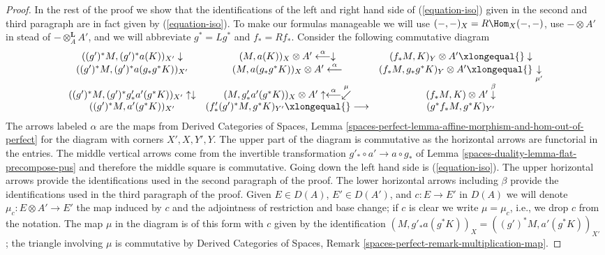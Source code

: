 \begin{proof}
\medskip\noindent
In the rest of the proof we show that the identifications of
the left and right hand side of (\ref{equation-iso})
given in the second and third paragraph are in fact given by
(\ref{equation-iso}). To make our formulas manageable
we will use $(-, -)_X = R\Hom_X(-, -)$, use $- \otimes A'$
in stead of $- \otimes_A^\mathbf{L} A'$, and we will abbreviate
$g^* = Lg^*$ and $f_* = Rf_*$. Consider the following
commutative diagram
$$
\begin{array}{ccc}((g')^*M, (g')^*a(K))_{X'} \downarrow & (M, a(K))_X \otimes A' \overset{\alpha}{\longleftarrow}\downarrow & (f_*M, K)_Y \otimes A' \xlongequal{}\downarrow \\ ((g')^*M, (g')^*a(g_*g^*K))_{X'} & (M, a(g_*g^*K))_X \otimes A' \overset{\alpha}{\longleftarrow} & (f_*M, g_*g^*K)_Y \otimes A' \xlongequal{}\underset{\mu'}{\downarrow} \\ ((g')^*M, (g')^*g'_*a'(g^*K))_{X'} \uparrow\downarrow & (M, g'_*a'(g^*K))_X \otimes A' \uparrow\overset{\alpha}{\longleftarrow}\overset{\mu}{\swarrow} & (f_*M, K) \otimes A' \overset{\beta}{\downarrow} \\ ((g')^*M, a'(g^*K))_{X'} & (f'_*(g')^*M, g^*K)_{Y'} \xlongequal{}\longrightarrow & (g^*f_*M, g^*K)_{Y'}\end{array}
$$
The arrows labeled $\alpha$ are the maps from
Derived Categories of Spaces, Lemma
\ref{spaces-perfect-lemma-affine-morphism-and-hom-out-of-perfect}
for the diagram with corners $X', X, Y', Y$.
The upper part of the diagram is commutative as the horizontal arrows are
functorial in the entries.
The middle vertical arrows come from the invertible transformation
$g'_* \circ a' \to a \circ g_*$  of Lemma \ref{spaces-duality-lemma-flat-precompose-pus}
and therefore the middle square is commutative.
Going down the left hand side is (\ref{equation-iso}).
The upper horizontal arrows provide the identifications used in the
second paragraph of the proof.
The lower horizontal arrows including $\beta$ provide the identifications
used in the third paragraph of the proof. Given $E \in D(A)$,
$E' \in D(A')$, and $c : E \to E'$ in $D(A)$ we will denote
$\mu_c : E \otimes A' \to E'$ the map induced by $c$
and the adjointness of restriction and base change;
if $c$ is clear we write $\mu = \mu_c$, i.e., we
drop $c$ from the notation. The map $\mu$ in the diagram is of this
form with $c$ given by the identification
$(M, g'_*a(g^*K))_X = ((g')^*M, a'(g^*K))_{X'}$
; the triangle involving $\mu$ is commutative by
Derived Categories of Spaces, Remark
\ref{spaces-perfect-remark-multiplication-map}.


\end{proof}
